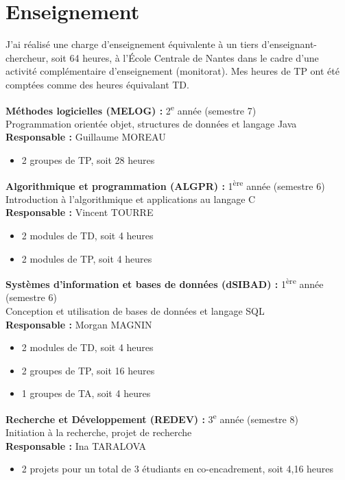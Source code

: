 \chapter{Enseignement}


J'ai réalisé une charge d'enseignement équivalente à un tiers d'enseignant-chercheur, soit 64 heures, à l'École Centrale de Nantes dans le cadre d'une activité complémentaire d'enseignement (monitorat). Mes heures de TP ont été comptées comme des heures équivalant TD.

\bigskip

\noindent
\textbf{Méthodes logicielles (MELOG) :} 2\textsuperscript{e} année (semestre 7)\\
Programmation orientée objet, structures de données et langage Java\\
\textbf{Responsable :} Guillaume MOREAU
\begin{itemize}
  \item 2 groupes de TP, soit 28 heures
\end{itemize}

\medskip\noindent
\textbf{Algorithmique et programmation (ALGPR) :} 1\textsuperscript{ère} année (semestre 6)\\
Introduction à l'algorithmique et applications au langage C\\
\textbf{Responsable :} Vincent TOURRE
\begin{itemize}
  \item 2 modules de TD, soit 4 heures
  \item 2 modules de TP, soit 4 heures
\end{itemize}

\medskip\noindent
\textbf{Systèmes d'information et bases de données (dSIBAD) :} 1\textsuperscript{ère} année (semestre 6)\\
Conception et utilisation de bases de données et langage SQL\\
\textbf{Responsable :} Morgan MAGNIN
\begin{itemize}
  \item 2 modules de TD, soit 4 heures
  \item 2 groupes de TP, soit 16 heures
  \item 1 groupes de TA, soit 4 heures
\end{itemize}

\medskip\noindent
\textbf{Recherche et Développement (REDEV) :} 3\textsuperscript{e} année (semestre 8)\\
Initiation à la recherche, projet de recherche\\
\textbf{Responsable :} Ina TARALOVA
\begin{itemize}
  \item 2 projets pour un total de 3 étudiants en co-encadrement, soit 4,16 heures
\end{itemize}

